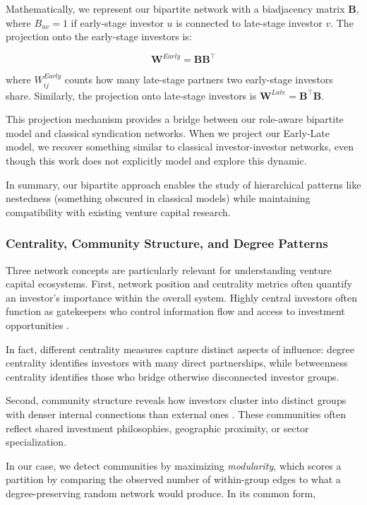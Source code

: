 Mathematically, we represent our bipartite network with a biadjacency matrix $\mathbf{B}$, where $B_{uv}=1$ if early-stage investor $u$ is connected to late-stage investor $v$. The projection onto the early-stage investors is:

$$\mathbf{W}^{Early}=\mathbf{B}\mathbf{B}^{\top}$$

where $W^{Early}_{ij}$ counts how many late-stage partners two early-stage investors share. Similarly, the projection onto late-stage investors is $\mathbf{W}^{Late}=\mathbf{B}^{\top}\mathbf{B}$.

This projection mechanism provides a bridge between our role-aware bipartite model and classical syndication networks. When we project our Early-Late model, we recover something similar to classical investor-investor networks, even though this work does not explicitly model and explore this dynamic.

In summary, our bipartite approach enables the study of hierarchical patterns like nestedness (something obscured in classical models) while maintaining compatibility with existing venture capital research.

\subsubsection{Centrality, Community Structure, and Degree Patterns}

Three network concepts are particularly relevant for understanding venture capital ecosystems. First, network position and centrality metrics often quantify an investor's importance within the overall system. Highly central investors often function as gatekeepers who control information flow and access to investment opportunities \cite{Borgatti2011}. 

In fact, different centrality measures capture distinct aspects of influence: degree centrality identifies investors with many direct partnerships, while betweenness centrality identifies those who bridge otherwise disconnected investor groups.

Second, community structure reveals how investors cluster into distinct groups with denser internal connections than external ones \cite{Theophile2024}. These communities often reflect shared investment philosophies, geographic proximity, or sector specialization. 

In our case, we detect communities by maximizing \emph{modularity}, which scores a partition by comparing the observed number of within-group edges to what a degree-preserving random network would produce. In its common form,

